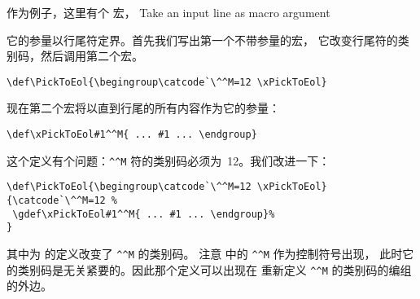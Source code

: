 \documentclass{book}
\begin{document}
作为例子，这里有个 \label{pick:eol} 宏，
\howto Take an input line as macro argument\par
它的参量以行尾符定界。首先我们写出第一个不带参量的宏，
它改变行尾符的类别码，然后调用第二个宏。
\begin{verbatim}
\def\PickToEol{\begingroup\catcode`\^^M=12 \xPickToEol}
\end{verbatim}
现在第二个宏将以直到行尾的所有内容作为它的参量：
\begin{verbatim}
\def\xPickToEol#1^^M{ ... #1 ... \endgroup}
\end{verbatim}
这个定义有个问题：\verb>^^M> 符的类别码必须为~12。我们改进一下：
\begin{verbatim}
\def\PickToEol{\begingroup\catcode`\^^M=12 \xPickToEol}
{\catcode`\^^M=12 %
 \gdef\xPickToEol#1^^M{ ... #1 ... \endgroup}%
}
\end{verbatim}
其中为  的定义改变了 \verb>^^M> 的类别码。
注意  中的 \verb>^^M> 作为控制符号出现，
此时它的类别码是无关紧要的。因此那个定义可以出现在
重新定义 \verb>^^M> 的类别码的编组的外边。
\end{document}
